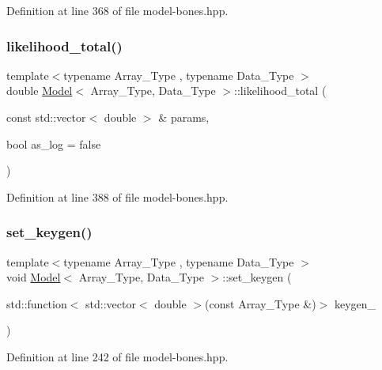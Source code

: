 Definition at line 368 of file model-\/bones.\+hpp.

\mbox{\label{class_model_a2fe9cf412c5b2323c35c18952f9cb09d}} 
\subsubsection{\texorpdfstring{likelihood\+\_\+total()}{likelihood\_total()}}
{\footnotesize\ttfamily template$<$typename Array\+\_\+\+Type , typename Data\+\_\+\+Type $>$ \\
double \hyperlink{class_model}{Model}$<$ Array\+\_\+\+Type, Data\+\_\+\+Type $>$\+::likelihood\+\_\+total (\begin{DoxyParamCaption}\item[{const std\+::vector$<$ double $>$ \&}]{params,  }\item[{bool}]{as\+\_\+log = {\ttfamily false} }\end{DoxyParamCaption})\hspace{0.3cm}{\ttfamily [inline]}}



Definition at line 388 of file model-\/bones.\+hpp.

\mbox{\label{class_model_afa4736153fa419e1f141839eda735dfe}} 
\subsubsection{\texorpdfstring{set\+\_\+keygen()}{set\_keygen()}}
{\footnotesize\ttfamily template$<$typename Array\+\_\+\+Type , typename Data\+\_\+\+Type $>$ \\
void \hyperlink{class_model}{Model}$<$ Array\+\_\+\+Type, Data\+\_\+\+Type $>$\+::set\+\_\+keygen (\begin{DoxyParamCaption}\item[{std\+::function$<$ std\+::vector$<$ double $>$(const Array\+\_\+\+Type \&)$>$}]{keygen\+\_\+ }\end{DoxyParamCaption})\hspace{0.3cm}{\ttfamily [inline]}}



Definition at line 242 of file model-\/bones.\+hpp.



